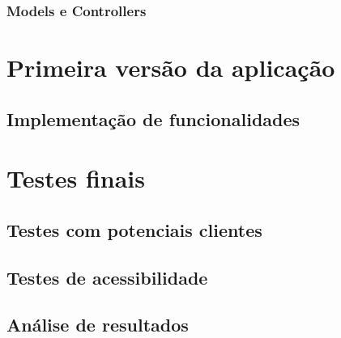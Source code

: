 \documentclass[11pt, twoside]{report}
\begin{document}
	\subsection{Models e Controllers}
	
	\chapter{Primeira versão da aplicação}
	\section{Implementação de funcionalidades}
	
	\chapter{Testes finais}
	\section{Testes com potenciais clientes}
	\section{Testes de acessibilidade}
	\section{Análise de resultados}
	
\end{document}
